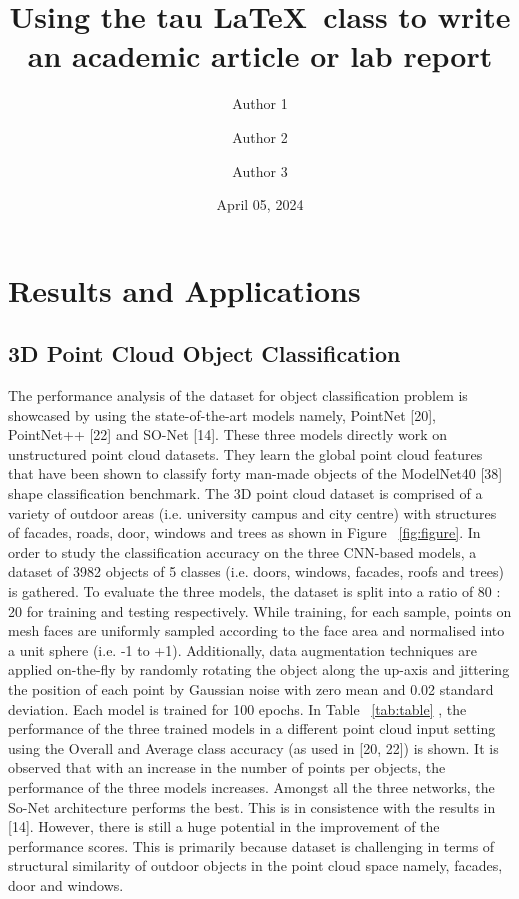 \documentclass[9pt,a4paper,twoside]{tau}
\title{Using the tau \LaTeX\ class to write an academic article or lab report}
\author[a,1]{Author 1}
\author[b,2]{Author 2}
\author[b,c,3]{Author 3}
\affil[a]{Affiliation of author one}
\affil[b]{Affiliation of author two}
\affil[c]{Affiliation of author three}
\date{April 05, 2024}
\begin{document}
	
    \maketitle
    \thispagestyle{firststyle}
    \tableofcontents


   \section{Results and Applications}
\subsection{3D Point Cloud Object Classification}
{The performance analysis of the dataset for object classification problem is showcased by
using the state-of-the-art models namely, PointNet [20], PointNet++ [22] and SO-Net [14]. These three models directly
work on unstructured point cloud datasets. They learn the global point cloud features that have been shown to classify
forty man-made objects of the ModelNet40 [38] shape classification benchmark. The 3D point cloud dataset is comprised
of a variety of outdoor areas (i.e. university campus and city centre) with structures of facades, roads, door, windows
and trees as shown in Figure ~\eqref{fig:figure}. In order to study the classification accuracy on the three CNN-based models, a dataset
of 3982 objects of 5 classes (i.e. doors, windows, facades, roofs and trees) is gathered. To evaluate the three models,
the dataset is split into a ratio of 80 : 20 for training and testing respectively. While training, for each sample,
points on mesh faces are uniformly sampled according to the face area and normalised into a unit sphere (i.e. -1 to
+1). Additionally, data augmentation techniques are applied on-the-fly by randomly rotating the object along the
up-axis and jittering the position of each point by Gaussian noise with zero mean and 0.02 standard deviation. Each
model is trained for 100 epochs. In Table ~\eqref{tab:table} , the performance of the three trained models in a different point cloud
input setting using the Overall and Average class accuracy (as used in [20, 22]) is shown. It is observed that with an
increase in the number of points per objects, the performance of the three models increases. Amongst all the three
networks, the So-Net architecture performs the best. This is in consistence with the results in [14]. However, there is
still a huge potential in the improvement of the performance scores. This is primarily because dataset is challenging
in terms of structural similarity of outdoor objects in the point cloud space namely, facades, door and windows.}
\end{document}

